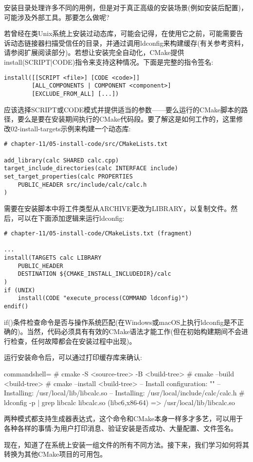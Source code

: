 安装目录处理许多不同的用例，但是对于真正高级的安装场景(例如安装后配置)，可能涉及外部工具。那要怎么做呢?


若曾经在类Unix系统上安装过动态库，可能会记得，在使用它之前，可能需要告诉动态链接器扫描受信任的目录，并通过调用ldconfig来构建缓存(有关参考资料，请参阅扩展阅读部分)。若想让安装完全自动化，CMake提供install(SCRIPT|CODE)指令来支持这种情况。下面是完整的指令签名:

\begin{lstlisting}[style=styleCMake]
install([[SCRIPT <file>] [CODE <code>]]
		[ALL_COMPONENTS | COMPONENT <component>]
		[EXCLUDE_FROM_ALL] [...])
\end{lstlisting}

应该选择SCRIPT或CODE模式并提供适当的参数——要么运行的CMake脚本的路径，要么是要在安装期间执行的CMake代码段。要了解这是如何工作的，这里修改02-install-targets示例来构建一个动态库:

\begin{lstlisting}[style=styleCMake]
# chapter-11/05-install-code/src/CMakeLists.txt

add_library(calc SHARED calc.cpp)
target_include_directories(calc INTERFACE include)
set_target_properties(calc PROPERTIES
	PUBLIC_HEADER src/include/calc/calc.h
)
\end{lstlisting}

需要在安装脚本中将工件类型从ARCHIVE更改为LIBRARY，以复制文件。然后，可以在下面添加逻辑来运行ldconfig:

\begin{lstlisting}[style=styleCMake]
# chapter-11/05-install-code/CMakeLists.txt (fragment)

...
install(TARGETS calc LIBRARY
	PUBLIC_HEADER
	DESTINATION ${CMAKE_INSTALL_INCLUDEDIR}/calc
)
if (UNIX)
	install(CODE "execute_process(COMMAND ldconfig)")
endif()
\end{lstlisting}

if()条件检查命令是否与操作系统匹配(在Windows或macOS上执行ldconfig是不正确的)。当然，代码必须具有有效的CMake语法才能工作(但在初始构建期间不会进行检查，任何故障都会在安装过程中出现)。

运行安装命令后，可以通过打印缓存库来确认:

\begin{tcblisting}{commandshell={}}
# cmake -S <source-tree> -B <build-tree>
# cmake --build <build-tree>
# cmake --install <build-tree>
-- Install configuration: ""
-- Installing: /usr/local/lib/libcalc.so
-- Installing: /usr/local/include/calc/calc.h
# ldconfig -p | grep libcalc
          libcalc.so (libc6,x86-64) => /usr/local/lib/libcalc.so
\end{tcblisting}

两种模式都支持生成器表达式，这个命令和CMake本身一样多才多艺，可以用于各种各样的事情:为用户打印消息、验证安装是否成功、大量配置、文件签名。

现在，知道了在系统上安装一组文件的所有不同方法。接下来，我们学习如何将其转换为其他CMake项目的可用包。





